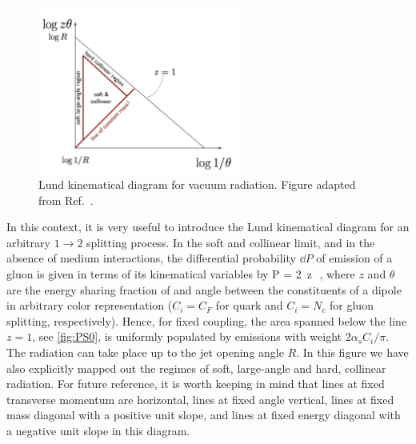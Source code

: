 \begin{figure}
\centering
\includegraphics[width=0.6\textwidth]{figures/kinematics/lund_2}%
\caption{Lund kinematical diagram for vacuum radiation. Figure adapted from Ref.~\cite{Dasgupta:2013ihk}.}
\label{fig:PS0}
\end{figure}
In this context, it is very useful to introduce the Lund kinematical diagram \cite{Andersson:1988gp} for an arbitrary $1\to 2$ splitting process. 
In the soft and collinear limit, and in the absence of medium interactions, the differential probability $\dd P$ of emission of a gluon is given in terms of its kinematical variables by \cite{Dokshitzer:1991wu,Ellis:1991qj}
\beq
\label{eq:vacuum-phase-space}
\dd P = 2\, \dd \log z\theta \, \dd \log{} \,,
\eeq
where $z$ and $\theta$ are the energy sharing fraction of and angle between the constituents of a dipole
in arbitrary color representation ($C_i=C_F$ for quark and $C_i = N_c$ for gluon splitting, respectively). Hence, for fixed coupling, the area spanned below the line $z=1$, see \autoref{fig:PS0}, is uniformly populated by emissions with weight $2\alpha_s C_i/\pi$.
The radiation can take place up to the jet opening angle $R$.
In this figure we have also explicitly mapped out the regimes of soft, large-angle  and hard, collinear radiation. For future reference, it is worth keeping in mind that lines at fixed transverse momentum are horizontal, lines at fixed angle vertical, lines at fixed mass diagonal with a positive unit slope, and lines at fixed energy diagonal with a negative unit slope in this diagram. 

